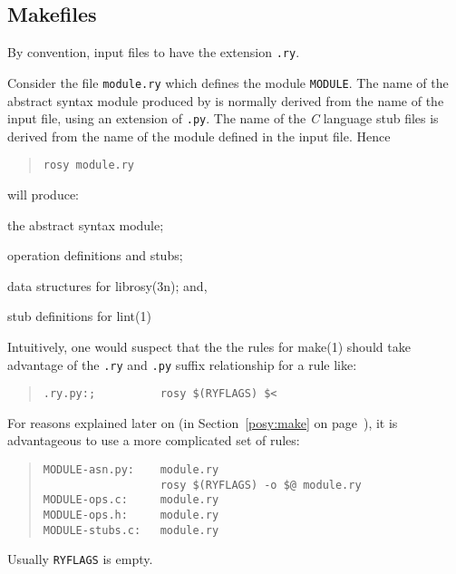 \subsection	{Makefiles}\label{rosy:make}
By convention,
input files to  have the extension \verb".ry".

Consider the file \verb"module.ry" which defines the module \verb"MODULE".
The name of the abstract syntax module produced by  is normally
derived from the name of the input file, using an extension of \verb".py".
The name of the {\em C\/} language stub files is derived from the name of the
module defined in the input file.
Hence
\begin{quote}\begin{verbatim}
rosy module.ry
\end{verbatim}\end{quote}
will produce:
\begin{describe}
\item[\verb"module.py":]	the abstract syntax module;

\item[\verb"MODULE-ops.h":]	operation definitions and stubs;

\item[\verb"MODULE-ops.c":]	data structures for \man librosy(3n);
				and,

\item[\verb"MODULE-stubs.c":]	stub definitions for \man lint(1)
\end{describe}

Intuitively, one would suspect that the the rules for \man make(1) should take
advantage of the \verb".ry" and \verb".py" suffix relationship for a rule
like:
\begin{quote}\small\begin{verbatim}
.ry.py:;          rosy $(RYFLAGS) $<
\end{verbatim}\end{quote}
For reasons explained later on
(in Section~\ref{posy:make} on page~\pageref{posy:make}),
it is advantageous to use a more complicated set of rules:
\begin{quote}\small\begin{verbatim}
MODULE-asn.py:    module.ry
                  rosy $(RYFLAGS) -o $@ module.ry
MODULE-ops.c:     module.ry
MODULE-ops.h:     module.ry
MODULE-stubs.c:   module.ry
\end{verbatim}\end{quote}
Usually \verb"RYFLAGS" is empty.

